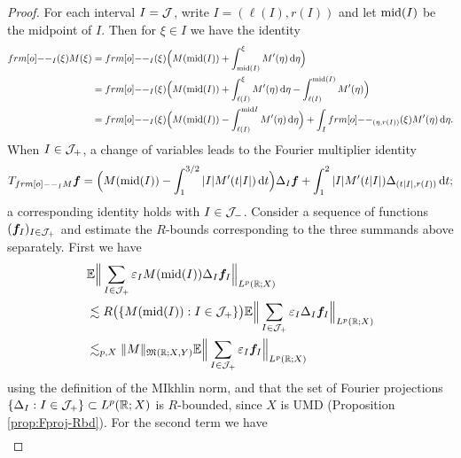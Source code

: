 \begin{proof}
  For each interval $I = \mathcal{J}$, write $I = (\ell(I), r(I))$ and let $\mathrm{mid}(I)$ be the midpoint of $I$.
  Then for $\xi \in I$ we have the identity
  \begin{equation*}
    \begin{aligned}
      \1_{I}(\xi)M(\xi)
      &= \1_{I}(\xi) \Big( M(\midp(I)) + \int_{\midp(I)}^{\xi} M'(\eta) \, \dd\eta \Big) \\
      &= \1_{I}(\xi) \Big( M(\midp(I)) + \int_{\ell(I)}^{\xi} M'(\eta) \, \dd\eta - \int_{\ell(I)}^{\midp(I)} M'(\eta) \Big) \\
      &= \1_{I}(\xi) \Big( M(\midp(I)) - \int_{\ell(I)}^{\midp{I}} M'(\eta) \, \dd\eta \Big) + \int_{I} \1_{(\eta,r(I))}(\xi) M'(\eta) \, \dd\eta.
    \end{aligned}
  \end{equation*}
  When $I \in \mathcal{J}_{+}$, a change of variables leads to the Fourier multiplier identity
  \begin{equation*}
    T_{\1_I M} \mb{f}
    = \Big( M(\midp(I)) - \int_{1}^{3/2} |I| M'(t|I|) \, \dd t \Big)\Delta_{I} \mb{f} + \int_{1}^{2} |I| M'(t|I|) \Delta_{(t|I|,r(I))} \, \dd t;
  \end{equation*}
  a corresponding identity holds with $I \in \mathcal{J}_{-}$.
  Consider a sequence of functions $(\bm{f}_{I})_{I \in \mathcal{J}_{+}}$ and estimate the $R$-bounds corresponding to the three summands above separately.
  First we have
  \begin{equation*}
    \begin{aligned}
      &\mathbb{E} \Big\| \sum_{I \in \mathcal{J}_{+}} \varepsilon_{I} M(\mathrm{mid}(I)) \Delta_{I} \bm{f}_{I} \Big\|_{L^p(\mathbb{R};X)} \\
      &\lesssim R\big( \{M(\mathrm{mid}(I)) : I \in \mathcal{J}_{+} \} \big) \mathbb{E} \Big\| \sum_{I \in \mathcal{J}_{+}} \varepsilon_{I}  \Delta_{I} \bm{f}_{I} \Big\|_{L^p(\mathbb{R};X)} \\
    &\lesssim_{p,X} \|M\|_{\mathfrak{M}(\mathbb{R};X,Y)} \mathbb{E} \Big\| \sum_{I \in \mathcal{J}_{+}} \varepsilon_{I} \bm{f}_{I} \Big\|_{L^p(\mathbb{R};X)} 
  \end{aligned}
\end{equation*}
using the definition of the MIkhlin norm, and that the set of Fourier projections $\{\Delta_{I} : I \in \mathcal{J}_{+}\} \subset L^p(\mathbb{R};X)$ is $R$-bounded, since $X$ is UMD (Proposition \ref{prop:Fproj-Rbd}).
For the second term we have
\begin{equation*}
  \begin{aligned}

\end{aligned}
\end{equation*}
\end{proof}
